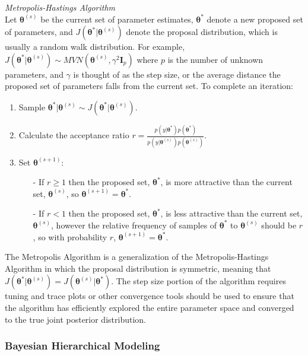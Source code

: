 \documentclass[12pt]{article}\usepackage[]{graphicx}\usepackage[]{color}
\begin{document}
\begin{mdframed}
\textit{Metropolis-Hastings Algorithm} \\
Let $\bm{\theta}^{(s)}$ be the current set of parameter estimates, $\bm{\theta}^*$ denote a new proposed set of parameters, and $J(\bm{\theta}^*|\bm{\theta}^{(s)})$ denote the proposal distribution, which is usually a random walk distribution. For example, $J(\bm{\theta}^*|\bm{\theta}^{(s)}) \sim MVN(\bm{\theta}^{(s)}, \gamma^2 \bm{I}_p)$ where $p$ is the number of unknown parameters, and $\gamma$ is thought of as the step size, or the average distance the proposed set of parameters falls from the current set. To complete an iteration: 
\begin{enumerate}
\item Sample $\bm{\theta}^*|\bm{\theta}^{(s)} \sim J(\bm{\theta}^*|\bm{\theta}^{(s)})$. 
\item Calculate the acceptance ratio $r = \frac{p(y|\bm{\theta}^*)p(\bm{\theta}^*)}{p(y|\bm{\theta}^{(s)})p(\bm{\theta}^{(s)})}$. 
\item Set $\bm{\theta}^{(s+1)}$:
\begin{itemize}
\item[-] If $r \geq 1$ then the proposed set, $\bm{\theta}^*$, is more attractive than the current set, $\bm{\theta}^{(s)}$, so $\bm{\theta}^{(s+1)} =   \bm{\theta}^*$. 
\item[-] If $r < 1$ then the proposed set, $\bm{\theta}^*$, is less attractive than the current set, $\bm{\theta}^{(s)}$, however the relative frequency of samples of $\bm{\theta}^*$ to $\bm{\theta}^{(s)}$ should be $r$, so with probability $r$, $\bm{\theta}^{(s+1)} = \bm{\theta}^*$.
\end{itemize}
\end{enumerate}
\end{mdframed}
  
\noindent The Metropolis Algorithm is a generalization of the Metropolis-Hastings Algorithm in which the proposal distribution is symmetric, meaning that $J(\bm{\theta}^*|\bm{\theta}^{(s)}) = J(\bm{\theta}^{(s)}|\bm{\theta}^*)$. The step size portion of the algorithm requires tuning and trace plots or other convergence tools should be used to ensure that the algorithm has efficiently explored the entire parameter space and converged to the true joint posterior distribution. 

\subsubsection{Bayesian Hierarchical Modeling}
\end{document}

